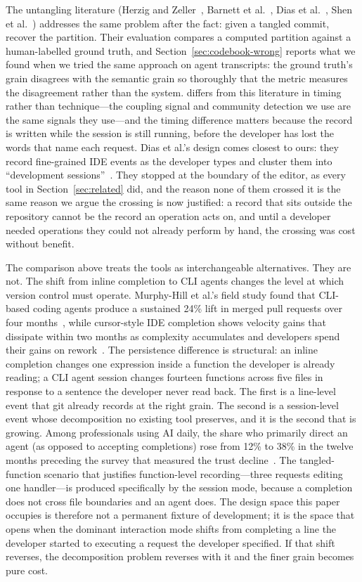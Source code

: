 The untangling literature (Herzig and Zeller~\cite{herzig2013}, Barnett et
al.~\cite{barnett2015}, Dias et al.~\cite{dias2015}, Shen et
al.~\cite{shen2021}) addresses the same problem after the fact: given a tangled
commit, recover the partition. Their evaluation compares a computed partition
against a human-labelled ground truth, and Section~\ref{sec:codebook-wrong}
reports what we found when we tried the same approach on agent transcripts: the
ground truth's grain disagrees with the semantic grain so thoroughly that the
metric measures the disagreement rather than the system. \sgt{} differs from this
literature in timing rather than technique---the coupling signal and community
detection we use are the same signals they use---and the timing difference
matters because the record is written while the session is still running, before
the developer has lost the words that name each request. Dias et al.'s design
comes closest to ours: they record fine-grained IDE events as the developer types
and cluster them into ``development sessions''~\cite{dias2015}. They stopped at
the boundary of the editor, as every tool in Section~\ref{sec:related} did, and
the reason none of them crossed it is the same reason we argue the crossing is
now justified: a record that sits outside the repository cannot be the record an
operation acts on, and until a developer needed operations they could not already
perform by hand, the crossing was cost without benefit.

The comparison above treats the tools as interchangeable alternatives. They are
not. The shift from inline completion to CLI agents changes the level at which
version control must operate. Murphy-Hill et al.'s field study found that
CLI-based coding agents produce a sustained 24\% lift in merged pull requests
over four months~\cite{murphyhill2026}, while cursor-style IDE completion shows
velocity gains that dissipate within two months as complexity accumulates and
developers spend their gains on rework~\cite{he2026}. The persistence difference
is structural: an inline completion changes one expression inside a function the
developer is already reading; a CLI agent session changes fourteen functions
across five files in response to a sentence the developer never read back. The
first is a line-level event that git already records at the right grain. The
second is a session-level event whose decomposition no existing tool preserves,
and it is the second that is growing. Among professionals using AI daily, the
share who primarily direct an agent (as opposed to accepting completions) rose
from 12\% to 38\% in the twelve months preceding the survey that measured the
trust decline~\cite{stackoverflow2025}. The tangled-function scenario that
justifies function-level recording---three requests editing one handler---is
produced specifically by the session mode, because a completion does not cross
file boundaries and an agent does. The design space this paper occupies is
therefore not a permanent fixture of development; it is the space that opens when
the dominant interaction mode shifts from completing a line the developer started
to executing a request the developer specified. If that shift reverses, the
decomposition problem reverses with it and the finer grain becomes pure cost.

